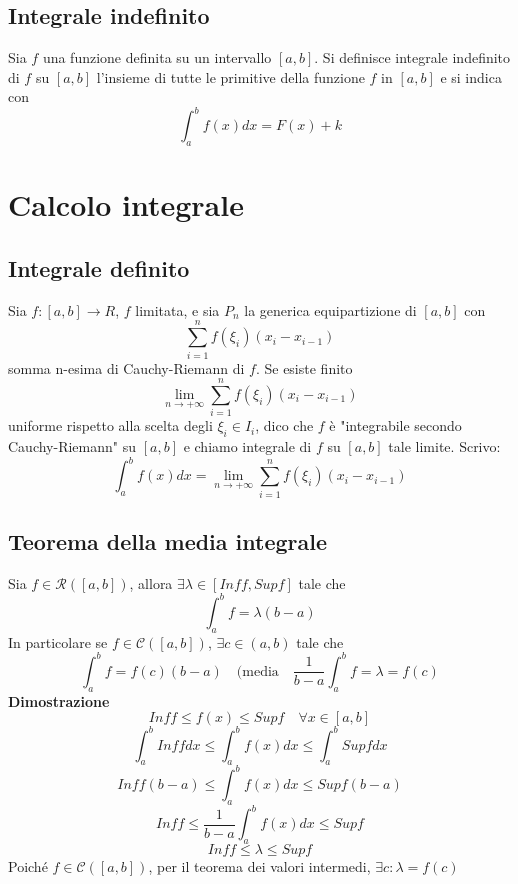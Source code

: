\documentclass[12pt]{article}
\begin{document}
\subsection{Integrale indefinito}
Sia $f$ una funzione definita su un intervallo $[a,b]$. Si definisce integrale indefinito di $f$ su $[a,b]$ l'insieme di tutte le primitive della funzione $f$ in $[a,b]$ e si indica con 
\[\int_a^b f(x)dx = F(x) + k\]

\section{Calcolo integrale}

\subsection{Integrale definito}
Sia $f:[a,b] \to R$, $f$ limitata, e sia $P_n$ la generica equipartizione di $[a,b]$ con 
\[ \sum_{i = 1}^{n}f(\xi_i)(x_i-x_{i-1})\]
somma n-esima di Cauchy-Riemann di $f$. Se esiste finito \[ \lim_{n \to +\infty} \sum_{i = 1}^{n}f(\xi_i)(x_i-x_{i-1})\]
uniforme rispetto alla scelta degli $\xi_i \in I_i$, dico che $f$ è "integrabile secondo Cauchy-Riemann" su $[a,b]$ e chiamo integrale di $f$ su $[a,b]$ tale limite.\newline
Scrivo: 
\[\displaystyle \int_{a}^{b} f(x)dx = \lim_{n \to +\infty} \sum_{i = 1}^{n}f(\xi_i)(x_i-x_{i-1})\]

\subsection{Teorema della media integrale}
Sia $f \in \mathscr{R}([a,b])$, allora $\exists \lambda \in [Inff, Supf]$ tale che 
\[
\int_{a}^{b}f = \lambda(b-a)\]
In particolare se $f \in \mathscr{C}([a,b])$, $\exists c \in (a,b)$ tale che
\[ \int_{a}^{b} f = f(c)(b-a) \quad ( \text{media} \quad \frac{1}{b-a}\int_{a}^{b} f = \lambda =f(c)\]
\newpage
\textbf{Dimostrazione}
\[Inff \leq f(x) \leq Supf \quad \forall x \in [a,b]\]
\[\int_{a}^{b} Inff dx \leq \int_{a}^{b} f(x) dx \leq \int_{a}^{b} Supf dx\]
\[Inff(b-a) \leq \int_{a}^{b} f(x) dx \leq Supf (b-a)\]
\[Inff \leq \frac{1}{b-a} \int_{a}^{b} f(x) dx \leq Supf\]
\[Inff \leq \lambda \leq Supf\]
Poiché $f \in \mathscr{C}([a,b])$, per il teorema dei valori intermedi, $\exists c: \lambda = f(c)$
\end{document}
